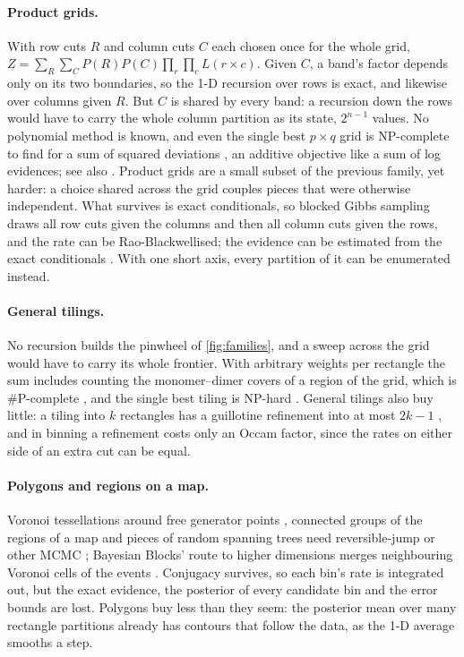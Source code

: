 \documentclass[11pt,a4paper]{article}
\begin{document}
\paragraph{Product grids.} With row cuts $R$ and column cuts $C$ each chosen once for the whole
grid, $Z = \sum_R \sum_C P(R) P(C) \prod_{r} \prod_{c} L(r \times c)$. Given $C$, a band's factor
depends only on its two boundaries, so the 1-D recursion over rows is exact, and likewise over
columns given $R$. But $C$ is shared by every band: a recursion down the rows would have to carry
the whole column partition as its state, $2^{n-1}$ values. No polynomial method is known, and even
the single best $p \times q$ grid is NP-complete to find for a sum of squared deviations
\citep{muthukrishnan2005approximation}, an additive objective like a sum of log evidences; see
also \citet{grigni1996complexity}. Product grids are a small subset of the previous family, yet
harder: a choice shared across the grid couples pieces that were otherwise independent. What
survives is exact conditionals, so blocked Gibbs sampling draws all row cuts given the columns and
then all column cuts given the rows, and the rate can be Rao-Blackwellised; the evidence can be
estimated from the exact conditionals \citep{chib1995marginal}. With one short axis, every
partition of it can be enumerated instead.

\paragraph{General tilings.} No recursion builds the pinwheel of \cref{fig:families}, and a sweep
across the grid would have to carry its whole frontier. With arbitrary weights per rectangle the
sum includes counting the monomer--dimer covers of a region of the grid, which is \#P-complete
\citep{jerrum1987two}, and the single best tiling is NP-hard \citep{muthukrishnan1999rectangular}.
General tilings also buy little: a tiling into $k$ rectangles has a guillotine refinement into at
most $2k - 1$ \citep{berman2002exact}, and in binning a refinement costs only an Occam factor,
since the rates on either side of an extra cut can be equal.

\paragraph{Polygons and regions on a map.} Voronoi tessellations around free generator points
\citep{byers2002bayesian}, connected groups of the regions of a map \citep{knorrheld2000bayesian}
and pieces of random spanning trees \citep{teixeira2019bayesian} need reversible-jump or other
MCMC \citep{green1995reversible}; Bayesian Blocks' route to higher dimensions merges neighbouring
Voronoi cells of the events \citep{scargle2001bayesian}. Conjugacy survives, so each bin's rate is
integrated out, but the exact evidence, the posterior of every candidate bin and the error bounds
are lost. Polygons buy less than they seem: the posterior mean over many rectangle partitions
already has contours that follow the data, as the 1-D average smooths a step.
\end{document}
